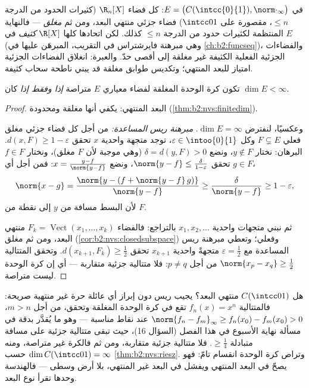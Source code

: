 \begin{example}\label{ex:b2:nvs:closeddense}
في $E = \bigl(C(\intcc{0}{1}), \norm\cdot_\infty\bigr)$: كل فضاء
$\R_n[X]$ (كثيرات الحدود من الدرجة $\leq n$، مقصورة على
$\intcc01$) فضاء جزئي منتهي البعد، ومن ثم \emph{مغلق}
--- فالنهاية المنتظمة لكثيرات حدود من الدرجة $\leq n$ كذلك. لكن
اتحادها كلها $\R[X]$ \emph{كثيف} في $E$ (وهي
مبرهنة فايرشتراس في التقريب، المبرهَن عليها في
\cref{ch:b2:funcseq})، والفضاءات الجزئية الفعلية الكثيفة
غير مغلقة إلى أقصى حدّ. والعبرة: انغلاق الفضاءات الجزئية
امتياز للبعد المنتهي؛ وتكديس طوابق مغلقة قد يبني
ناطحة سحاب كثيفة.
\end{example}

\begin{theorem}[ريس]\label{thm:b2:nvs:riesz}
تكون كرة الوحدة المغلقة لفضاء معياري $E$ متراصة \emph{إذا وفقط
إذا} كان $\dim E < \infty$.
\end{theorem}

\begin{proof}
البعد المنتهي: يكفي أنها مغلقة ومحدودة
(\cref{thm:b2:nvs:finitedim}).

وعكسيًا، لنفترض $\dim E = \infty$. \emph{مبرهنة ريس المساعدة:} من أجل
كل فضاء جزئي مغلق فعلي $F \subsetneq E$ وكل $\varepsilon \in
\intoo{0}{1}$، توجد متجهة واحدية $x$ تحقق $d(x, F) \geq 1 -
\varepsilon$. البرهان: نختار $y \notin F$، ونضع $\delta = d(y, F) > 0$
(وهي موجبة لأن $F$ مغلق)، ونختار $f \in F$ تحقق $\norm{y - f} \leq
\frac{\delta}{1 - \varepsilon}$، ونضع $x = \frac{y - f}{\norm{y -
f}}$: فمن أجل أي $g \in F$،
\[
\norm{x - g} = \frac{\norm{y - (f + \norm{y-f}\,g)}}{\norm{y - f}}
\geq \frac{\delta}{\norm{y-f}} \geq 1 - \varepsilon ,
\]
لأن البسط مسافة من $y$ إلى نقطة من $F$.

ثم نبني متجهات واحدية $x_1, x_2, \dots$ بالتراجع: فالفضاء $F_k =
\operatorname{Vect}(x_1, \dots, x_k)$ منتهي البعد، ومن ثم
مغلق (\cref{cor:b2:nvs:closedsubspace}) وفعلي؛ وتعطي مبرهنة ريس المساعدة
مع $\varepsilon = \frac12$ متجهةً واحدية $x_{k+1}$ تحقق $d(x_{k+1},
F_k) \geq \frac12$. وتحقق المتتالية $\norm{x_p - x_q} \geq
\frac12$ من أجل $p \neq q$: فلا متتالية جزئية متقاربة --- أي إن كرة الوحدة
ليست متراصة.
\end{proof}

\begin{example}\label{ex:b2:nvs:rieszdetector}
هل $C(\intcc01)$ منتهي البعد؟ يجيب ريس دون
إبراز أي عائلة حرة غير منتهية صريحة: فالمتتالية
$f_n(x) = x^n$ تقع في كرة الوحدة المغلقة وتحقق، من أجل
$m > n$، $\norm{f_n - f_m}_\infty \geq f_n(x_0) - f_m(x_0) > 0$
عند نقاط مناسبة --- وهو ما يُقدَّر بدقة في مسألة نهاية
الأسبوع في هذا الفصل (السؤال 16)، حيث تبقى متتالية جزئية على
مسافة متبادلة $\geq \frac14$. فلا متتالية جزئية متقاربة، ومن ثم
فالكرة غير متراصة، ومنه $\dim C(\intcc01) = \infty$ حسب
\cref{thm:b2:nvs:riesz}. وتراص كرة الوحدة انقسام
تامّ: فهو يصحّ في البعد المنتهي ويفشل في
البعد غير المنتهي، بلا أرض وسطى --- فالهندسة وحدها
تقرأ نوع البعد.
\end{example}

